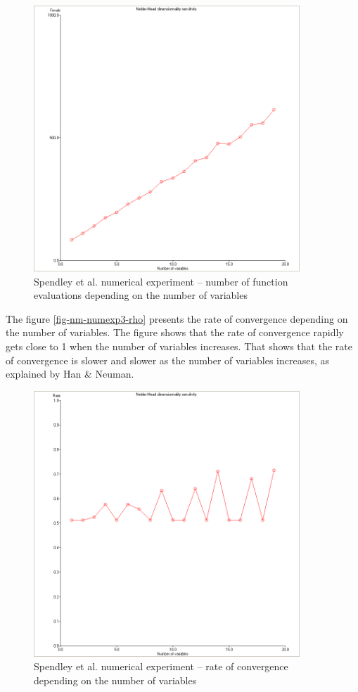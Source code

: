 \begin{figure}
\begin{center}
\includegraphics[width=10cm]{spendley-dimension-nfevals.png}
\end{center}
\caption{Spendley et al. numerical experiment -- number of function evaluations 
depending on the number of variables}
\label{fig-sp-numexp3-fvn}
\end{figure}

The figure \ref{fig-nm-numexp3-rho} presents the rate of convergence 
depending on the number of variables. The figure shows that 
the rate of convergence rapidly gets close to 1 when the number 
of variables increases. That shows that the rate of convergence 
is slower and slower as the number of variables increases, as 
explained by Han \& Neuman.

\begin{figure}
\begin{center}
\includegraphics[width=10cm]{spendley-dimension-rho.png}
\end{center}
\caption{Spendley et al. numerical experiment -- rate of convergence 
depending on the number of variables}
\label{fig-sp-numexp3-rho}
\end{figure}

